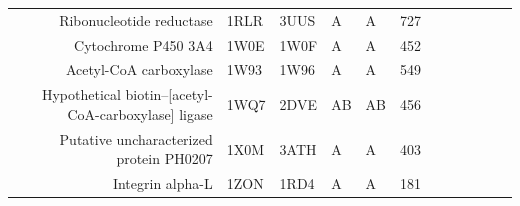 \begin{table}
\begin{scriptsize}
\begin{tabular}{ r p{0.8cm} p{0.8cm} p{0.8cm} p{0.8cm} r r r r r r r }
\multicolumn{1}{r}{Ribonucleotide reductase} & \multicolumn{1}{l}{1RLR} & \multicolumn{1}{l}{3UUS} & \multicolumn{1}{l}{A} & \multicolumn{1}{l}{A} & 727   & \cellcolor[rgb]{ .573,  .816,  .314}  & \cellcolor[rgb]{ .573,  .816,  .314}  & \cellcolor[rgb]{ 1,  .494,  .475}  & \cellcolor[rgb]{ 1,  .494,  .475}  & \cellcolor[rgb]{ .573,  .816,  .314}  & \cellcolor[rgb]{ 1,  .494,  .475}  \\
\multicolumn{1}{r}{Cytochrome P450 3A4} & \multicolumn{1}{l}{1W0E} & \multicolumn{1}{l}{1W0F} & \multicolumn{1}{l}{A} & \multicolumn{1}{l}{A} & 452   & \cellcolor[rgb]{ 1,  .494,  .475}  & \cellcolor[rgb]{ 1,  .494,  .475}  & \cellcolor[rgb]{ 1,  .494,  .475}  & \cellcolor[rgb]{ 1,  .494,  .475}  & \cellcolor[rgb]{ 1,  .494,  .475}  & \cellcolor[rgb]{ 1,  .494,  .475}  \\
\multicolumn{1}{r}{Acetyl-CoA carboxylase} & \multicolumn{1}{l}{1W93} & \multicolumn{1}{l}{1W96} & \multicolumn{1}{l}{A} & \multicolumn{1}{l}{A} & 549   & \cellcolor[rgb]{ .573,  .816,  .314}  & \cellcolor[rgb]{ 1,  .494,  .475}  & \cellcolor[rgb]{ .573,  .816,  .314}  & \cellcolor[rgb]{ .573,  .816,  .314}  & \cellcolor[rgb]{ 1,  .494,  .475}  & \cellcolor[rgb]{ .573,  .816,  .314}  \\
\multicolumn{1}{r}{Hypothetical biotin--[acetyl-CoA-carboxylase] ligase} & \multicolumn{1}{l}{1WQ7} & \multicolumn{1}{l}{2DVE} & \multicolumn{1}{l}{AB} & \multicolumn{1}{l}{AB} & 456   & \cellcolor[rgb]{ .573,  .816,  .314}  & \cellcolor[rgb]{ .573,  .816,  .314}  & \cellcolor[rgb]{ .573,  .816,  .314}  & \cellcolor[rgb]{ .573,  .816,  .314}  & \cellcolor[rgb]{ .573,  .816,  .314}  & \cellcolor[rgb]{ .573,  .816,  .314}  \\
\multicolumn{1}{r}{Putative uncharacterized protein PH0207} & \multicolumn{1}{l}{1X0M} & \multicolumn{1}{l}{3ATH} & \multicolumn{1}{l}{A} & \multicolumn{1}{l}{A} & 403   & \cellcolor[rgb]{ .573,  .816,  .314}  & \cellcolor[rgb]{ .573,  .816,  .314}  & \cellcolor[rgb]{ .573,  .816,  .314}  & \cellcolor[rgb]{ .573,  .816,  .314}  & \cellcolor[rgb]{ .573,  .816,  .314}  & \cellcolor[rgb]{ .573,  .816,  .314}  \\
\multicolumn{1}{r}{Integrin alpha-L} & \multicolumn{1}{l}{1ZON} & \multicolumn{1}{l}{1RD4} & \multicolumn{1}{l}{A} & \multicolumn{1}{l}{A} & 181   & \cellcolor[rgb]{ .573,  .816,  .314}  & \cellcolor[rgb]{ .573,  .816,  .314}  & \cellcolor[rgb]{ 1,  1,  0}  & \cellcolor[rgb]{ .573,  .816,  .314}  & \cellcolor[rgb]{ .573,  .816,  .314}  & \cellcolor[rgb]{ .573,  .816,  .314}  \\

\end{tabular}
\end{scriptsize}
\end{table}
